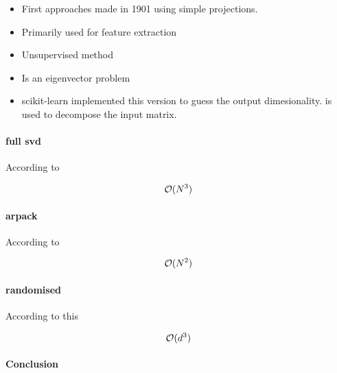 \begin{itemize}
	\item First approaches made in 1901 using simple projections. \cite{pearson1901liii}
	\item Primarily used for feature extraction \cite{PythonMachineLearningCh5}
	\item Unsupervised method \cite{PythonMachineLearningCh5}
	\item Is an eigenvector problem \cite{MultilinearSubspaceLearningCh2}
	\item scikit-learn implemented this version \cite{minka2000automatic} to guess the output dimesionality. \cite{halko2009finding} is used to decompose the input matrix.
\end{itemize}


\clearpage

\paragraph{full \gls{svd}} \label{svd}

According to \cite{wright2001large}

$$\mathcal{O}(N^3)$$

\clearpage

\paragraph{\gls{arpack}}

According to \cite{wright2001large}

$$\mathcal{O}(N^2)$$

\clearpage

\paragraph{randomised}

According to this \cite{HandsOnMLCh8}

$$\mathcal{O}(d^3)$$


\clearpage

\paragraph{Conclusion}
